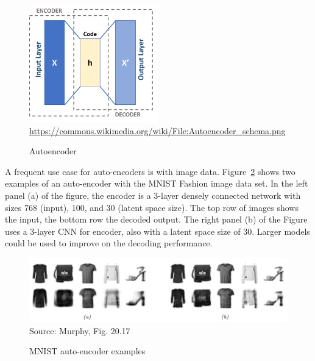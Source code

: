 \begin{figure}
\begin{center}
\includegraphics[height=2in]{Autoencoder_schema.png} \\

\scriptsize \url{https://commons.wikimedia.org/wiki/File:Autoencoder_schema.png} \normalsize
\caption{Autoencoder}
\label{fig:autoencoder}
\end{center}
\end{figure}

A frequent use case for auto-encoders is with image data. Figure~\ref{fig:mnist_autoencoder} shows two examples of an auto-encoder with the MNIST Fashion image data set. In the left panel (a) of the figure, the encoder is a 3-layer densely connected network with sizes 768 (input), 100, and 30 (latent space size). The top row of images shows the input, the bottom row the decoded output. The right panel (b) of the Figure uses a 3-layer CNN for encoder, also with a latent space size of 30. Larger models could be used to improve on the decoding performance. 

\begin{figure}
\begin{center}
\includegraphics[width=\textwidth]{murphy_20_17.png} \\

\scriptsize Source: Murphy, Fig. 20.17 \normalsize
\caption{MNIST auto-encoder examples}
\label{fig:mnist_autoencoder}
\end{center}
\end{figure}

